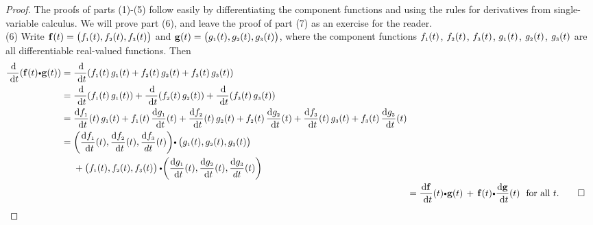 \begin{proof}
 The proofs of parts (1)-(5) follow easily by differentiating the component 
functions and using the rules for
 derivatives from single-variable calculus. We will prove part (6), and leave 
the proof of part (7) as an exercise for
 the reader.\vspace{1mm}\\ (6)
 Write $\mathbf{ f}(t) = \left( f_{\scriptscriptstyle 1}(t),f_{\scriptscriptstyle 2}(t),f_{\scriptscriptstyle 3}(t) \right)$ and
 $\mathbf{ g}(t) = \left( g_{\scriptscriptstyle 1}(t),g_{\scriptscriptstyle 2}(t),g_{\scriptscriptstyle 3}(t) \right)$, where the 
component functions
 $f_{\scriptscriptstyle 1}(t)$, $f_{\scriptscriptstyle 2}(t)$, $f_{\scriptscriptstyle 3}(t)$, $g_{\scriptscriptstyle 1}(t)$, 
$g_{\scriptscriptstyle 2}(t)$, $g_{\scriptscriptstyle 3}(t)$ are all
 differentiable real-valued functions. Then
 \begin{align}\begin{split}
  \dfrac{\d}{\dt} ( \Dotprod{\funvect{f}(t)}{\funvect{g}(t)} ) &= 
\dfrac{\d}{\dt} ( \ssub{f}{1}(t)\,\ssub{g}{1}(t) +
   \ssub{f}{2}(t)\,\ssub{g}{2}(t) + \ssub{f}{3}(t)\,\ssub{g}{3}(t) )\\
  &= \dfrac{\d}{\dt} ( \ssub{f}{1}(t)\,\ssub{g}{1}(t) ) +
   \dfrac{\d}{\dt} ( \ssub{f}{2}(t)\,\ssub{g}{2}(t) ) + \dfrac{\d}{\dt} ( 
\ssub{f}{3}(t)\,\ssub{g}{3}(t) )\\
  &= \dfrac{\d\ssub{f}{1}}{\dt}(t)\,\ssub{g}{1}(t) + 
\ssub{f}{1}(t)\,\dfrac{\d\ssub{g}{1}}{\dt}(t) +
   \dfrac{\d\ssub{f}{2}}{\dt}(t)\,\ssub{g}{2}(t) + 
\ssub{f}{2}(t)\,\dfrac{\d\ssub{g}{2}}{\dt}(t) +
   \dfrac{\d\ssub{f}{3}}{\dt}(t)\,\ssub{g}{3}(t) + 
\ssub{f}{3}(t)\,\dfrac{\d\ssub{g}{3}}{\dt}(t)\\
  &= \Dotprod{\biggl( 
\dfrac{\d\ssub{f}{1}}{\dt}(t),\dfrac{\d\ssub{f}{2}}{\dt}(t),\dfrac{\d\ssub{f}{3}
}{ dt} (t) \biggr)}{
   \left( \ssub{g}{1}(t),\ssub{g}{2}(t),\ssub{g}{3}(t) \right)}\\
   &\mathrel{\phantom{=}} {} + \Dotprod{\left( 
\ssub{f}{1}(t),\ssub{f}{2}(t),\ssub{f}{3}(t) \right)}{
   \biggl( 
\dfrac{\d\ssub{g}{1}}{\dt}(t),\dfrac{\d\ssub{g}{2}}{\dt}(t),\dfrac{\d\ssub{g}{3}
}{ dt} (t) \biggr)}\end{split}\\
  &= \Dotprod{\dfrac{\d\funvect{f}}{\dt}(t)}{\funvect{g}(t)} \,+\, 
\Dotprod{\funvect{f}(t)}{\dfrac{\d\funvect{g}}{\dt}(t)}
   \text{~~for all $t$.} \qed
 \end{align}
\end{proof}

